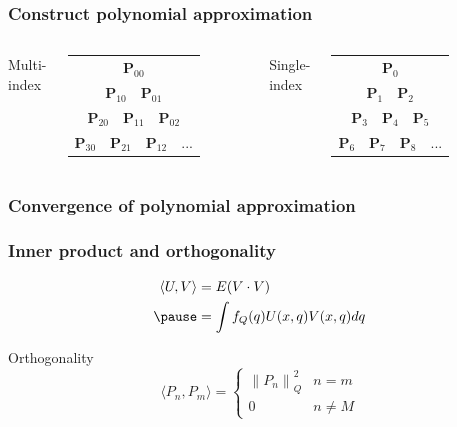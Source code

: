 \documentclass[handout]{beamer}
\newcommand{\norm}[1]{\left\lVert#1\right\rVert}
\begin{document}
\begin{frame}
  \frametitle{Construct polynomial approximation}
  \begin{columns}[c] 
      Multi-index\\
    \begin{tabular}{c}
    \\
      $\mathbf{P}_{00}$\\
    $\mathbf{P}_{10} \quad \mathbf{P}_{01}$\\
    $\mathbf{P}_{20} \quad \mathbf{P}_{11}\quad \mathbf{P}_{02}$\\
    $\mathbf{P}_{30} \quad \mathbf{P}_{21}\quad \mathbf{P}_{12}\quad ...$ 
  \end{tabular}


Single-index\\
\begin{tabular}{c}
\\
    $\mathbf{P}_{0}$\\
    $\mathbf{P}_{1} \quad \mathbf{P}_{2}$\\
    $\mathbf{P}_{3} \quad \mathbf{P}_{4}\quad \mathbf{P}_{5}$\\
    $\mathbf{P}_{6} \quad \mathbf{P}_{7}\quad \mathbf{P}_{8}\quad ...$ 
  \end{tabular}
  \end{columns}
\end{frame}
\begin{frame}
  \frametitle{Convergence of polynomial approximation}

\end{frame}


\begin{frame}
  \frametitle{Inner product and orthogonality}

    \begin{align*}
    \langle U,V \rangle &= E(V\cdot V)\\
    \pause
    &= \int f_Q(q)U(x,q)V(x,q)dq
  \end{align*}

  \pause
  Orthogonality
  \[\langle P_n,P_m\rangle =
  \begin{cases}
    \norm{P_n}^2_Q & n = m \\
    0 & n \neq M
  \end{cases}\]

\end{frame}
\end{document}
